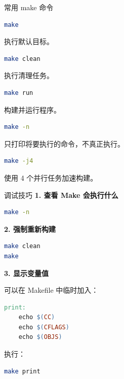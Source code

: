 \documentclass[aspectratio=169]{ctexbeamer}
\begin{document}
\begin{frame}[fragile]{常用 make 命令}
\begin{lstlisting}[language=bash]
make
\end{lstlisting}
执行默认目标。

\begin{lstlisting}[language=bash]
make clean
\end{lstlisting}
执行清理任务。

\begin{lstlisting}[language=bash]
make run
\end{lstlisting}
构建并运行程序。

\begin{lstlisting}[language=bash]
make -n
\end{lstlisting}
只打印将要执行的命令，不真正执行。

\begin{lstlisting}[language=bash]
make -j4
\end{lstlisting}
使用 4 个并行任务加速构建。
\end{frame}

\begin{frame}{调试技巧}
\textbf{1. 查看 Make 会执行什么}

\begin{lstlisting}[language=bash]
make -n
\end{lstlisting}

\textbf{2. 强制重新构建}

\begin{lstlisting}[language=bash]
make clean
make
\end{lstlisting}

\textbf{3. 显示变量值}

可以在 Makefile 中临时加入：

\begin{lstlisting}[language=make]
print:
	echo $(CC)
	echo $(CFLAGS)
	echo $(OBJS)
\end{lstlisting}

执行：

\begin{lstlisting}[language=bash]
make print
\end{lstlisting}
\end{frame}
\end{document}
